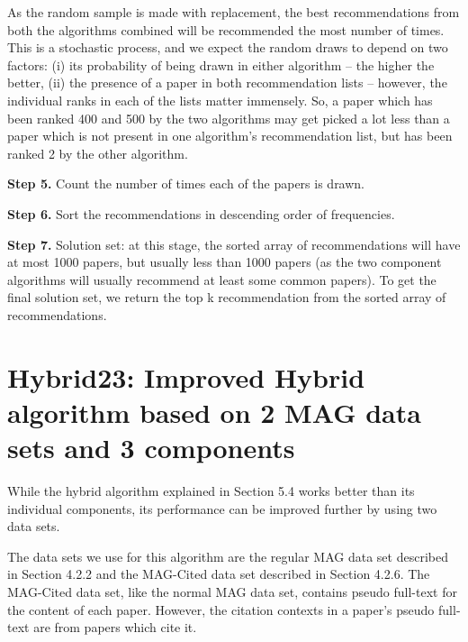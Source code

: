 As the random sample is made with replacement, the best recommendations from both the algorithms combined will be recommended the most number of times. This is a stochastic process, and we expect the random draws to depend on two factors: (i) its probability of being drawn in either algorithm -- the higher the better, (ii) the presence of a paper in both recommendation lists -- however, the individual ranks in each of the lists matter immensely. So, a paper which has been ranked 400 and 500 by the two algorithms may get picked a lot less than a paper which is not present in one algorithm's recommendation list, but has been ranked 2 by the other algorithm.

\textbf{Step 5.} Count the number of times each of the papers is drawn. 

\textbf{Step 6.} Sort the recommendations in descending order of frequencies. 

\textbf{Step 7.} Solution set: at this stage, the sorted array of recommendations will have at most 1000 papers, but usually less than 1000 papers (as the two component algorithms will usually recommend at least some common papers). To get the final solution set, we return the top k recommendation from the sorted array of recommendations.
\section{Hybrid23: Improved Hybrid algorithm based on 2 MAG data sets and 3 components}
While the hybrid algorithm explained in Section 5.4 works better than its individual components, its performance can be improved further by using two data sets. 

The data sets we use for this algorithm are the regular MAG data set described in Section 4.2.2 and the MAG-Cited data set described in Section 4.2.6. The MAG-Cited data set, like the normal MAG data set, contains pseudo full-text for the content of each paper. However, the citation contexts in a paper's pseudo full-text are from papers which cite it. 

